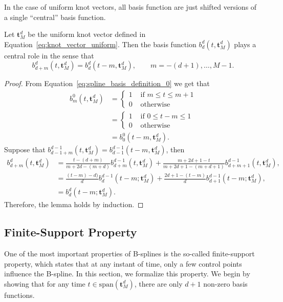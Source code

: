 In the case of uniform knot vectors, all basis function are just shifted versions of a single ``central'' basis function.

\begin{lemma} \label{lem:shifted_central_basis}
Let $\mathbf{t}_M^d$ be the uniform knot vector defined in Equation~\eqref{eq:knot_vector_uniform}. Then the basis function $b_d^d(t, \mathbf{t}_M^d)$ plays a central role in the sense that
\[
	b_{d+m}^d(t,  \mathbf{t}_M^d) = b_d^d(t-m, \mathbf{t}_M^d), \qquad m=-(d+1), \dots, M-1.
\]
\end{lemma}
\begin{proof}
From Equation~\eqref{eq:spline_basis_definition_0} we get that
\begin{align*}
	b_m^0(t,  \mathbf{t}_M^d) &= \begin{cases} 1 & \text{~if~} m \leq t \leq m+1 \\ 
 									 		  0 & \text{~otherwise} 
 					   			\end{cases} 
 					   		\\
 					   		 &= \begin{cases} 1 & \text{~if~} 0 \leq t-m \leq 1 \\ 
 									 		  0 & \text{~otherwise} 
 					   			\end{cases} 
 					   		\\
 					   		&= b_0^0(t-m, \mathbf{t}_M^d).
\end{align*}
Suppose that $b_{d-1+m}^{d-1}(t,  \mathbf{t}_M^d) = b_{d-1}^{d-1}(t-m, \mathbf{t}_M^d)$, then
\begin{align*}
b_{d+m}^{d}(t, \mathbf{t}_M^d) 
	&= \frac{t-(d+m)}{m+2d-(m+d)} b_{d+m}^{d-1}(t,  \mathbf{t}_M^d) + \frac{m+2d+1-t}{m+2d+1-(m+d+1)} b_{d+m+1}^{d-1}(t,  \mathbf{t}_M^d),
	\\	
	&= \frac{(t-m)-d)}{d} b_{d}^{d-1}(t-m; \mathbf{t}_M^d) + \frac{2d+1-(t-m)}{d} b_{d+1}^{d-1}(t-m; \mathbf{t}_M^d),
	\\
	&= b_d^d(t-m; \mathbf{t}_M^d).
\end{align*}
Therefore, the lemma holds by induction.
\end{proof}

\subsection{Finite-Support Property}

One of the most important properties of B-splines is the so-called finite-support property, which states that at any instant of time, only a few control points influence the B-spline.  In this section, we formalize this property.  We begin by showing that for any time $t\in\text{span}(\mathbf{t}_M^d)$, there are only $d+1$ non-zero basis functions.

